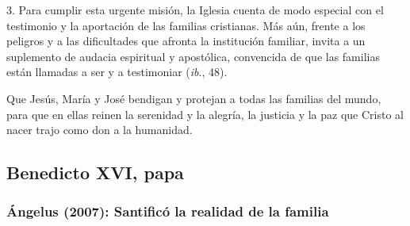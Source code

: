 \begin{body}
					3. Para cumplir esta urgente misión, la Iglesia cuenta de modo especial con el testimonio y la aportación de las familias cristianas. Más aún, frente a los peligros y a las dificultades que afronta la institución familiar, invita a un suplemento de audacia espiritual y apostólica, convencida de que las familias están llamadas a ser  y a testimoniar  (\emph{ib}., 48).
					
					Que Jesús, María y José bendigan y protejan a todas las familias del mundo, para que en ellas reinen la serenidad y la alegría, la justicia y la paz que Cristo al nacer trajo como don a la humanidad.
				\end{body}

	\newsection
	
		\subsection{Benedicto XVI, papa}
		
			\subsubsection{Ángelus (2007): Santificó la realidad de la familia}
			
				
